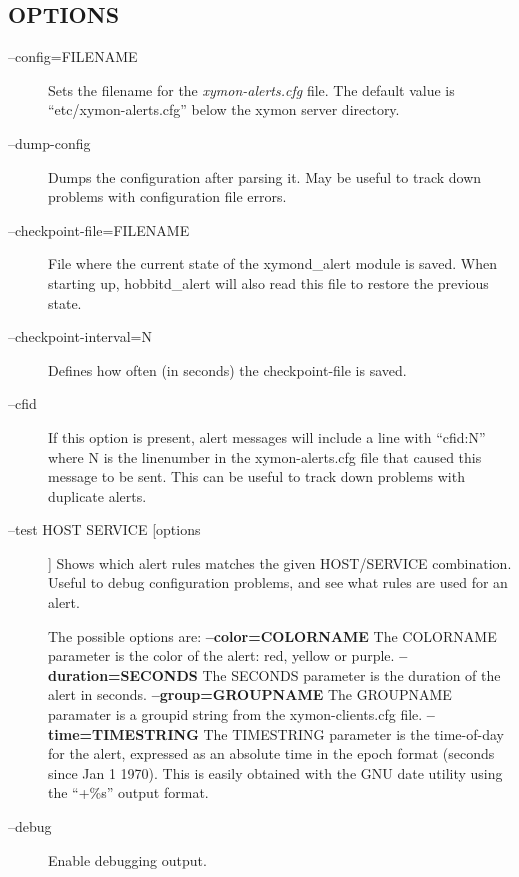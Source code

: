 \subsection{OPTIONS}
\begin{description}
\item[--config=FILENAME] Sets the filename for the \emph{xymon-alerts.cfg}
 file. The default value is ``etc/xymon-alerts.cfg'' below the xymon server directory. 

 

\item[--dump-config] Dumps the configuration after parsing it. May be
  useful to track down problems with configuration file errors. 


 

\item[--checkpoint-file=FILENAME] File where the current state of the
  xymond\_alert module is saved. When starting up, hobbitd\_alert
  will also read this file to restore the previous state. 


 

\item[--checkpoint-interval=N] Defines how often (in seconds) the checkpoint-file is saved. 

 

\item[--cfid] If this option is present, alert messages will include a
  line with ``cfid:N'' where N is the linenumber in the
  xymon-alerts.cfg file that caused this message to be sent. This can
  be useful to track down problems with duplicate alerts. 


 

\item[--test HOST SERVICE [options]] Shows which alert rules matches
  the given HOST/SERVICE combination. Useful to debug configuration
  problems, and see what rules are used for an alert. 


  The possible options are:  
\textbf{--color=COLORNAME}
 The COLORNAME parameter is the color of the alert: red, yellow or purple.  
\textbf{--duration=SECONDS}
 The SECONDS parameter is the duration of the alert in seconds.  
\textbf{--group=GROUPNAME}
 The GROUPNAME paramater is a groupid string from the xymon-clients.cfg file.  
\textbf{--time=TIMESTRING}
 The TIMESTRING parameter is the time-of-day for the alert, expressed
 as an absolute time in the epoch format (seconds since Jan 1
 1970). This is easily obtained with the GNU date utility using the
 ``+\%s'' output format. 



\item[--debug] Enable debugging output. 

 


\end{description}

